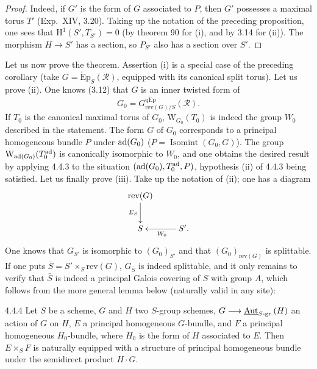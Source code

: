\begin{proof}
Indeed, if $G'$ is the form of $G$ associated to $P$, then $G'$ possesses a maximal torus $T'$ (Exp.~XIV, 3.20). Taking up the notation of the preceding proposition, one sees that $\mathrm H^1(S',T_{S'})=0$ (by theorem 90 for (i), and by 3.14 for (ii)). The morphism $H\to S'$ has a section, so $P_{S'}$ also has a section over $S'$.
\end{proof}
Let us now prove the theorem. Assertion (i) is a special case of the preceding corollary (take $G=\operatorname{\acute Ep}_S(\mathscr R)$, equipped with its canonical split torus). Let us prove (ii). One knows (3.12) that $G$ is an inner twisted form of
\[
G_0=G^{\mathrm{q\acute Ep}}_{\mathrm{rev}(G)/S}(\mathscr R).
\]
If $T_0$ is the canonical maximal torus of $G_0$, $\mathrm W_{G_0}(T_0)$ is indeed the group $W_0$ described in the statement. The form $G$ of $G_0$ corresponds to a principal homogeneous bundle $P$ under $\operatorname{ad}(G_0)$ ($P=\underline{\operatorname{Isomint}}(G_0,G)$). The group $\mathrm W_{\operatorname{ad}(G_0)}(T_0^{\mathrm{ad}})$ is canonically isomorphic to $W_0$, and one obtains the desired result by applying 4.4.3 to the situation $(\operatorname{ad}(G_0),T_0^{\mathrm{ad}},P)$, hypothesis (ii) of 4.4.3 being satisfied. Let us finally prove (iii). Take up the notation of (ii); one has a diagram
\[
\xymatrix{\mathrm{rev}(G)\ar[d]_{E_S}&\\S&S'.\ar[l]^{W_0}}
\]
One knows that $G_{S'}$ is isomorphic to $(G_0)_{S'}$ and that $(G_0)_{\mathrm{rev}(G)}$ is splittable. If one puts $\bar S=S'\times_S\mathrm{rev}(G)$, $G_{\bar S}$ is indeed splittable, and it only remains to verify that $\bar S$ is indeed a principal Galois covering of $S$ with group $A$, which follows from the more general lemma below (naturally valid in any site):
\begin{lemma}{4.4.4}\label{XXIV.4.4.4}
Let $S$ be a scheme, $G$ and $H$ two $S$-group schemes, $G\longrightarrow\underline{\operatorname{Aut}}_{S\text{-gr.}}(H)$ an action of $G$ on $H$, $E$ a principal homogeneous $G$-bundle, and $F$ a principal homogeneous $H_0$-bundle, where $H_0$ is the form of $H$ associated to $E$. Then $E\times_S F$ is naturally equipped with a structure of principal homogeneous bundle under the semidirect product $H\cdot G$.
\end{lemma}
